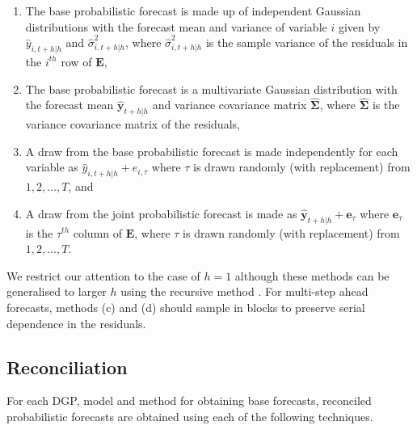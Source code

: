\documentclass[12pt]{article}
\theoremstyle{definition}
\begin{document}
\begin{enumerate}[label=(\alph*)]
	\item The base probabilistic forecast is made up of independent Gaussian distributions with the forecast mean and variance of variable $i$ given by $\hat{y}_{i,t+h|h}$ and $\hat{\sigma}^2_{i,t+h|h}$, where $\hat{\sigma}^2_{i,t+h|h}$ is the sample variance of the residuals in the $i^{th}$ row of $\bm{E}$,
	\item The base probabilistic forecast is a multivariate Gaussian distribution with the forecast mean $\hat{\bm{y}}_{t+h|h}$ and variance covariance matrix $\hat{\bm\Sigma}$, where $\hat{\bm\Sigma}$ is the variance covariance matrix of the residuals,
	\item A draw from the base probabilistic forecast is made independently for each variable as $\hat{y}_{i,t+h|h}+e_{i,\tau}$ where $\tau$ is drawn randomly (with replacement) from $1,2,\ldots, T$, and
	\item A draw from the joint probabilistic forecast is made as $\hat{\bm y}_{t+h|h}+\bm{e}_{\tau}$ where $\bm{e}_{\tau}$ is the $\tau^{th}$ column of $\bm{E}$, where $\tau$ is drawn randomly (with replacement) from $1,2,\ldots, T$.
\end{enumerate}

We restrict our attention to the case of $h=1$ although these methods can be generalised to larger $h$ using the recursive method \citep{FPP2018}.  For multi-step ahead forecasts, methods (c) and (d) should sample in blocks to preserve serial dependence in the residuals.

\subsection{Reconciliation}

For each DGP, model and method for obtaining base forecasts, reconciled probabilistic forecasts are obtained using each of the following techniques.
\end{document}
